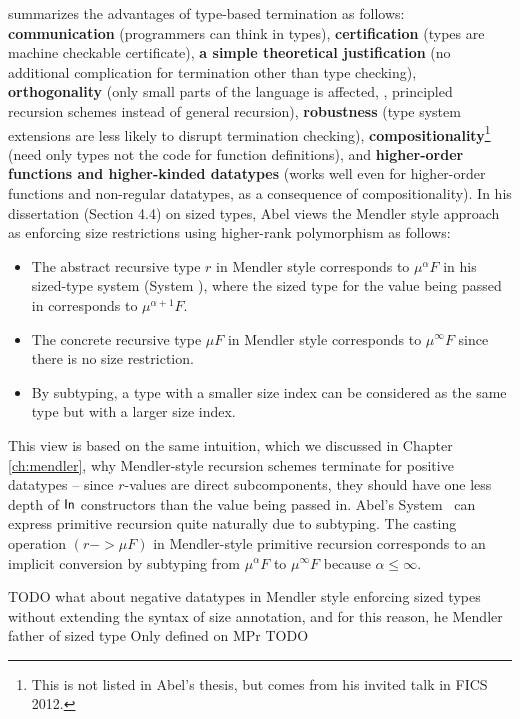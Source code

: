 \citet{abel06phd,Abel12talkFICS} summarizes the advantages of
type-based termination as follows:
\textbf{communication} (programmers can think in types),
\textbf{certification} (types are machine checkable certificate),
\textbf{a simple theoretical justification}
	(no additional complication for termination other than type checking),
\textbf{orthogonality} (only small parts of the language is affected,
	\eg, principled recursion schemes instead of general recursion),
\textbf{robustness} (type system extensions are less likely to
			disrupt termination checking),
\textbf{compositionality}\footnote{This is not listed in Abel's thesis,
				but comes from his invited talk in FICS 2012.}
	(need only types not the code for function definitions), and
\textbf{higher-order functions and higher-kinded datatypes}
	(works well even for higher-order functions and non-regular datatypes,
	as a consequence of compositionality).
In his dissertation \cite{abel06phd} (Section 4.4) on sized types,
Abel views the Mendler style approach as enforcing size restrictions
using higher-rank polymorphism as follows:
\begin{itemize}
\item The abstract recursive type $r$ in Mendler style corresponds to
	$\mu^\alpha F$ in his sized-type system (System \Fwhat),
	where the sized type
	for the value being passed in corresponds to $\mu^{\alpha+1} F$.
\item The concrete recursive type $\mu F$ in Mendler style corresponds to
	$\mu^\infty F$ since there is no size restriction.
\item By subtyping, a type with a smaller size index can be considered as
	the same type but with a larger size index.
\end{itemize}
This view is based on the same intuition, which we discussed in
Chapter \ref{ch:mendler}, why Mendler-style recursion schemes terminate for
positive datatypes -- since $r$-values are direct subcomponents, they should
have one less depth of $\mathsf{In}$ constructors than the value being passed in.
Abel's System \Fwhat\ can express primitive recursion quite naturally
due to subtyping. The casting operation $(r -> \mu F)$ in Mendler-style
primitive recursion corresponds to an implicit conversion by subtyping
from $\mu^\alpha F$ to $\mu^\infty F$ because $\alpha \leq \infty$.

TODO what about negative datatypes
in Mendler style
enforcing sized types without extending the syntax of size annotation,
and for this reason, he Mendler father of sized type
Only defined on MPr
TODO

